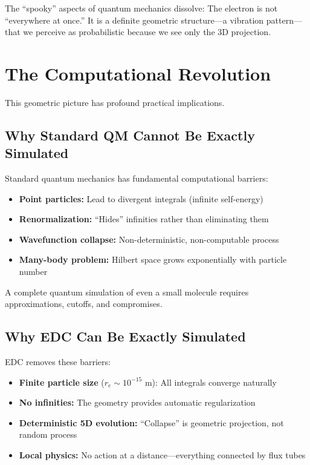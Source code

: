 The ``spooky'' aspects of quantum mechanics dissolve: The electron is not ``everywhere at once.'' It is a definite geometric structure---a vibration pattern---that we perceive as probabilistic because we see only the 3D projection.


\section{The Computational Revolution}
\label{sec:computation}

This geometric picture has profound practical implications.

\subsection{Why Standard QM Cannot Be Exactly Simulated}
\label{subsec:standard_limits}

Standard quantum mechanics has fundamental computational barriers:

\begin{itemize}
    \item \textbf{Point particles:} Lead to divergent integrals (infinite self-energy)
    \item \textbf{Renormalization:} ``Hides'' infinities rather than eliminating them
    \item \textbf{Wavefunction collapse:} Non-deterministic, non-computable process
    \item \textbf{Many-body problem:} Hilbert space grows exponentially with particle number
\end{itemize}

A complete quantum simulation of even a small molecule requires approximations, cutoffs, and compromises.

\subsection{Why EDC Can Be Exactly Simulated}
\label{subsec:edc_simulation}

EDC removes these barriers:

\begin{itemize}
    \item \textbf{Finite particle size} ($r_e \sim 10^{-15}$ m): All integrals converge naturally
    \item \textbf{No infinities:} The geometry provides automatic regularization
    \item \textbf{Deterministic 5D evolution:} ``Collapse'' is geometric projection, not random process
    \item \textbf{Local physics:} No action at a distance---everything connected by flux tubes
\end{itemize}

